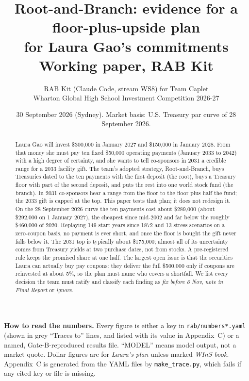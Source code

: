 \documentclass[11pt,a4paper]{article}
\title{\vspace{-1.8em}\textbf{Root-and-Branch: evidence for a floor-plus-upside plan\\ for Laura Gao's commitments}\\[0.3em]
\large Working paper, RAB Kit}
\author{\normalsize RAB Kit (Claude Code, stream WS8) for Team Caplet\\ \normalsize Wharton Global High School Investment Competition 2026-27\\[0.2em]
\normalsize\fcolorbox{red!60!black}{red!4}{\parbox{0.86\textwidth}{\centering\textbf{\banner.}\\
The team writes every deliverable. Nothing here was executed in WInS, and the IPS was not edited.}}}
\date{\normalsize 30 September 2026 (Sydney). Market basis: U.S. Treasury par curve of 28 September 2026.}
\begin{document}
\maketitle
\thispagestyle{fancy}

\begin{abstract}
\noindent Laura Gao will invest \$300,000 in January 2027 and \$150,000 in January 2028. From that money she must
pay ten fixed \$50,000 operating payments (January 2033 to 2042) with a high degree of certainty, and she wants to
tell co-sponsors in 2031 a credible range for a 2033 facility gift. The team's adopted strategy, Root-and-Branch,
buys Treasuries dated to the ten payments with the first deposit (the root), buys a Treasury floor with part of the
second deposit, and puts the rest into one world stock fund (the branch). In 2031 co-sponsors hear a range from the
floor to the floor plus half the fund; the 2033 gift is capped at the top. This paper tests that plan; it does not
redesign it. On the 28 September 2026 curve the ten payments cost about \$289,000 (about \$292,000 on 1 January 2027),
the cheapest since mid-2002 and far below the roughly \$460,000 of 2020. Replaying 149 start years since 1872 and 13
stress scenarios on a zero-coupon basis, no payment is ever short, and once the floor is bought the gift never falls
below it. The 2031 top is typically about \$175,000; almost all of its uncertainty comes from Treasury yields at two
purchase dates, not from stocks. A pre-registered rule keeps the promised share at one half. The largest open issue is
that the securities Laura can actually buy pay coupons: they deliver the full \$500,000 only if coupons are
reinvested at about 5\%, so the plan must name who covers a shortfall. We list every decision the team must ratify
and classify each finding as \emph{fix before 6 Nov}, \emph{note in Final Report} or \emph{ignore}.
\end{abstract}

\vspace{-0.4em}
{\small\textbf{How to read the numbers.} Every figure is either a key in \texttt{rab/numbers*.yaml} (shown in grey
``Traces to'' lines, and listed with its value in Appendix~C) or a named, Gate-B-reproduced results file. ``MODEL''
means model output, not a market quote. Dollar figures are for \emph{Laura's plan} unless marked \emph{WInS book}.
Appendix~C is generated from the YAML files by \texttt{make\_trace.py}, which fails if any cited key or file is missing.}

\end{document}
